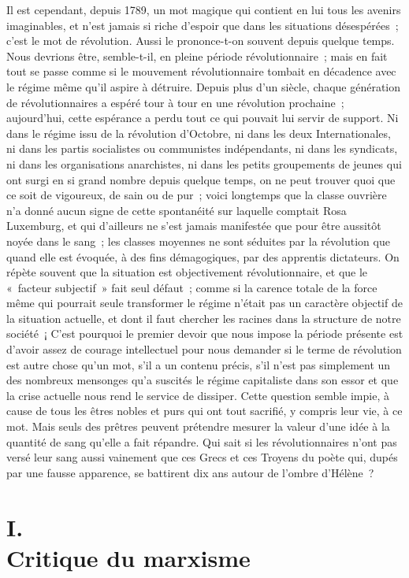 \documentclass[french,twoside]{book} %
\begin{document}
Il est cependant, depuis 1789, un mot magique qui contient en lui tous les avenirs imaginables, et n'est jamais si riche d'espoir que dans les situations désespérées ; c'est le mot de révolution. Aussi le prononce-t-on souvent depuis quelque temps. Nous devrions être, semble-t-il, en pleine période révolutionnaire ; mais en fait tout se passe comme si le mouvement révolutionnaire tombait en décadence avec le régime même qu'il aspire à détruire. Depuis plus d'un siècle, chaque génération de révolutionnaires a espéré tour à tour en une révolution prochaine ; aujourd'hui, cette espérance a perdu tout ce qui pouvait lui servir de support. Ni dans le régime issu de la révolution d'Octobre, ni dans les deux Internationales, ni dans les partis socialistes ou communistes indépendants, ni dans les syndicats, ni dans les organisations anarchistes, ni dans les petits groupements de jeunes qui ont surgi en si grand nombre depuis quelque temps, on ne peut trouver quoi que ce soit de vigoureux, de sain ou de pur ; voici longtemps que la classe ouvrière n'a donné aucun signe de cette spontanéité sur laquelle comptait Rosa Luxemburg, et qui d'ailleurs ne s'est jamais manifestée que pour être aussitôt noyée dans le sang ; les classes moyennes ne sont séduites par la révolution que quand elle est évoquée, à des fins démagogiques, par des apprentis dictateurs. On répète souvent que la situation est objectivement révolutionnaire, et que le « facteur subjectif » fait seul défaut ; comme si la carence totale de la force même qui pourrait seule transformer le régime n'était pas un caractère objectif de la situation actuelle, et dont il faut chercher les racines dans la structure de notre société ¡ C'est pourquoi le premier devoir que nous impose la période présente est d'avoir assez de courage intellectuel pour nous demander si le terme de révolution est autre chose qu'un mot, s'il a un contenu précis, s'il n'est pas simplement un des nombreux mensonges qu'a suscités le régime capitaliste dans son essor et que la crise actuelle nous rend le service de dissiper. Cette question semble impie, à cause de tous les êtres nobles et purs qui ont tout sacrifié, y compris leur vie, à ce mot. Mais seuls des prêtres peuvent prétendre mesurer la valeur d'une idée à la quantité de sang qu'elle a fait répandre. Qui sait si les révolutionnaires n'ont pas versé leur sang aussi vainement que ces Grecs et ces Troyens du poète qui, dupés par une fausse apparence, se battirent dix ans autour de l'ombre d'Hélène ?
\section[I. Critique du marxisme]{I. \\
Critique du marxisme}\renewcommand{\leftmark}{I. \\
Critique du marxisme}
\end{document}
